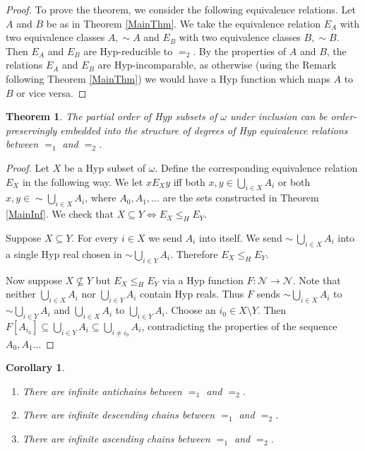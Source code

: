 \documentclass[11pt, english]{article}
\newtheorem{thm}{Theorem}
\newtheorem{cor}{Corollary}
\newcommand{\baire}{\mathscr N}
\begin{document}
\begin{proof}
To prove the theorem, we consider the following equivalence
relations. Let $A$ and $B$ be as in Theorem \ref{MainThm}. We take
the equivalence relation $E_A$ with two equivalence classes $A,\sim
A$ and $E_B$ with two equivalence classes $B, \sim B$. Then $E_A$
and $E_B$ are Hyp-reducible to $=_2$. By the properties of $A$ and
$B$, the relations $E_A$ and $E_B$ are Hyp-incomparable, as
otherwise (using the Remark following Theorem \ref{MainThm}) we
would have a Hyp function which maps $A$ to $B$ or vice versa.
\end{proof}

\begin{thm}
The partial order of Hyp subsets of $\omega$ under inclusion can be
order-preservingly embedded into the structure of degrees of Hyp
equivalence relations between $=_1$ and $=_2$.
\end{thm}

\begin{proof}
Let $X$ be a Hyp subset of $\omega$. Define the corresponding
equivalence relation $E_X$ in the following way. We let $xE_Xy$ iff
both $x,y\in\bigcup_{i\in X}A_i$ or both $x,y\in\sim\bigcup_{i\in
X}A_i$, where $A_0,A_1,\ldots$ are the sets constructed in Theorem
\ref{MainInf}. We check that $X\subseteq Y\Longleftrightarrow
E_X\leq_HE_Y$.

Suppose $X\subseteq Y$. For every $i\in X$ we send $A_i$ into
itself. We send $\sim~\bigcup_{i\in X}A_i$ into a single Hyp real
chosen in $\sim\bigcup_{i\in Y}A_i$. Therefore $E_X\leq_HE_Y$.

Now suppose $X\nsubseteq Y$ but $E_X\leq_H E_Y$ via a Hyp function
$F:\baire\to\baire$. Note that neither $\bigcup_{i\in X}A_i$ nor
$\bigcup_{i\in Y}A_i$ contain Hyp reals. Thus $F$ sends
$\sim\bigcup_{i\in X}A_i$ to $\sim\bigcup_{i\in Y}A_i$ and
$\bigcup_{i\in X}A_i$ to $\bigcup_{i\in Y}A_i$. Choose an $i_0\in
X\setminus Y$. Then $F[A_{i_0}]\subseteq\bigcup_{i\in
Y}A_i\subseteq\bigcup_{i\neq i_0}A_i$, contradicting the properties
of the sequence $A_0,A_1\ldots$
\end{proof}


\begin{cor}
 \begin{enumerate}
  \item There are infinite antichains between $=_1$ and $=_2$.
  \item There are infinite descending chains between $=_1$ and $=_2$.
  \item There are infinite ascending chains between $=_1$ and $=_2$.
 \end{enumerate}
\end{cor}
\end{document}
